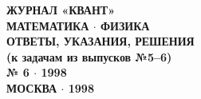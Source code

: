
\thispagestyle{empty}

\begin{center}
    \vspace*{2cm}
    {\LARGE\textbf{ЖУРНАЛ «КВАНТ»}}\\[1.5cm]
    
    {\Large\textbf{МАТЕМАТИКА $\cdot$ ФИЗИКА}}\\[2cm]
    
    {\LARGE\textbf{ОТВЕТЫ, УКАЗАНИЯ, РЕШЕНИЯ}}\\[0.5cm]
    {\large\textbf{(к задачам из выпусков №5--6)}}\\[3cm]
    
    {\large\textbf{№ 6 $\cdot$ 1998}}\\[14cm]
    
    {\large\textbf{МОСКВА $\cdot$ 1998}}
\end{center}

\clearpage